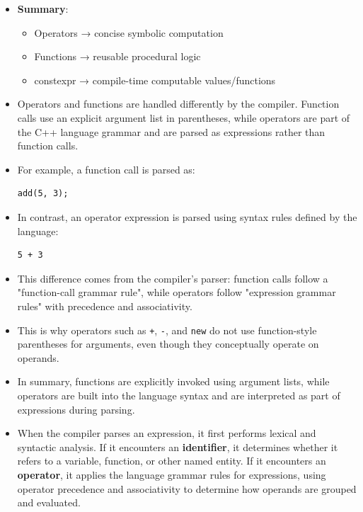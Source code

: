 \documentclass[10pt]{article}
\newcommand{\pbreak}{\vspace{30pt}}
\begin{document}
\begin{itemize}
	\item \textbf{Summary}:
	\begin{itemize}
		\item Operators → concise symbolic computation
		\item Functions → reusable procedural logic
		\item constexpr → compile-time computable values/functions
	\end{itemize}

	\pbreak

	\item Operators and functions are handled differently by the compiler. Function calls use an explicit argument list in parentheses, while operators are part of the C++ language grammar and are parsed as expressions rather than function calls.

\item For example, a function call is parsed as:
\begin{verbatim}
add(5, 3);
\end{verbatim}

\item In contrast, an operator expression is parsed using syntax rules defined by the language:
\begin{verbatim}
5 + 3
\end{verbatim}

\item This difference comes from the compiler's parser: function calls follow a "function-call grammar rule", while operators follow "expression grammar rules" with precedence and associativity.

\item This is why operators such as \verb|+|, \verb|-|, and \verb|new| do not use function-style parentheses for arguments, even though they conceptually operate on operands.

\item In summary, functions are explicitly invoked using argument lists, while operators are built into the language syntax and are interpreted as part of expressions during parsing.

	\pbreak

	\item When the compiler parses an expression, it first performs lexical and syntactic analysis. If it encounters an \textbf{identifier}, it determines whether it refers to a variable, function, or other named entity. If it encounters an \textbf{operator}, it applies the language grammar rules for expressions, using operator precedence and associativity to determine how operands are grouped and evaluated.


\end{itemize}
\end{document}
